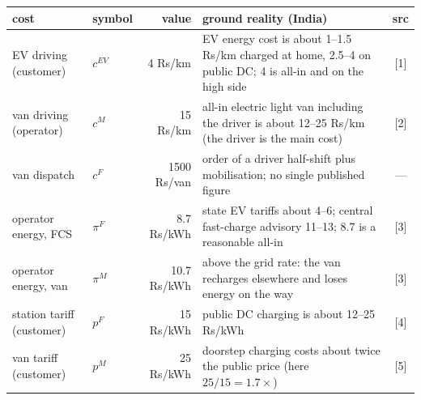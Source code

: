 \small
\begin{tabularx}{\linewidth}{@{}llr>{\raggedright\arraybackslash}Xc@{}}
\toprule
cost & symbol & value & ground reality (India) & src \\
\midrule
EV driving (customer) & $c^{EV}$ & 4 Rs/km & EV energy cost is about 1--1.5 Rs/km charged at home, 2.5--4 on public DC; 4 is all-in and on the high side & [1] \\
van driving (operator) & $c^{M}$ & 15 Rs/km & all-in electric light van including the driver is about 12--25 Rs/km (the driver is the main cost) & [2] \\
van dispatch & $c^{F}$ & 1500 Rs/van & order of a driver half-shift plus mobilisation; no single published figure & --- \\
operator energy, FCS & $\pi^{F}$ & 8.7 Rs/kWh & state EV tariffs about 4--6; central fast-charge advisory 11--13; 8.7 is a reasonable all-in & [3] \\
operator energy, van & $\pi^{M}$ & 10.7 Rs/kWh & above the grid rate: the van recharges elsewhere and loses energy on the way & [3] \\
station tariff (customer) & $p^{F}$ & 15 Rs/kWh & public DC charging is about 12--25 Rs/kWh & [4] \\
van tariff (customer) & $p^{M}$ & 25 Rs/kWh & doorstep charging costs about twice the public price (here $25/15=1.7\times$) & [5] \\
\bottomrule
\end{tabularx}
